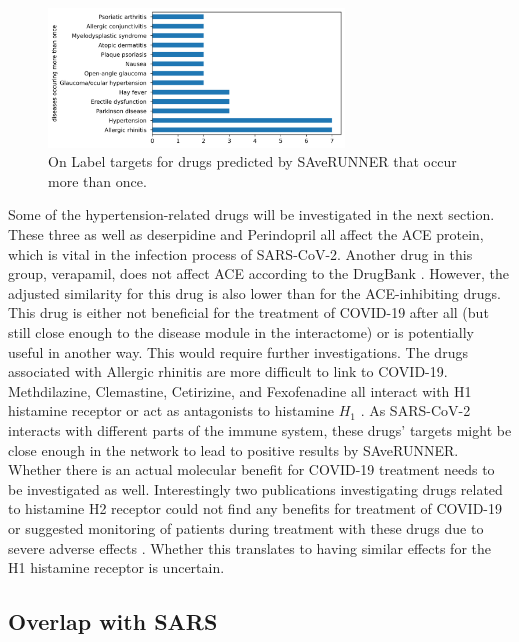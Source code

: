 \begin{figure}[H]
    \captionsetup{width=0.7\textwidth}
    \centering
    \includegraphics[width=0.7\textwidth]{figures/onLabel_diseases_saverunner_covid.png}
    \caption{On Label targets for drugs predicted by SAveRUNNER that occur more than once.}
    \label{fig:onLabel}
\end{figure}

Some of the hypertension-related drugs will be investigated in the next section. These three as well as deserpidine and Perindopril all affect the ACE protein, which is vital in the infection process of SARS-CoV-2. Another drug in this group, verapamil, does not affect ACE according to the DrugBank \cite{Wishart2017}. However, the adjusted similarity for this drug is also lower than for the ACE-inhibiting drugs. This drug is either not beneficial for the treatment of COVID-19 after all (but still close enough to the disease module in the interactome) or is potentially useful in another way. This would require further investigations.
The drugs associated with Allergic rhinitis are more difficult to link to COVID-19. Methdilazine, Clemastine, Cetirizine, and Fexofenadine all interact with H1 histamine receptor or act as antagonists to histamine $H_{1}$ \cite{Wishart2017}. As SARS-CoV-2 interacts with different parts of the immune system, these drugs' targets might be close enough in the network to lead to positive results by SAveRUNNER. Whether there is an actual molecular benefit for COVID-19 treatment needs to be investigated as well. Interestingly two publications investigating drugs related to histamine H2 receptor could not find any benefits for treatment of COVID-19 or suggested monitoring of patients during treatment with these drugs due to severe adverse effects \cite{Kim_2021, Chiu_2021}. Whether this translates to having similar effects for the H1 histamine receptor is uncertain.


\newpage
\subsection{Overlap with SARS}

